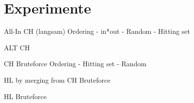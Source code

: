 \chapter{Experimente}


All-In CH (langsam)
Ordering
- in*out
- Random
- Hitting set

ALT CH

CH Bruteforce
Ordering
- Hitting set
- Random

HL by merging from CH Bruteforce

HL Bruteforce